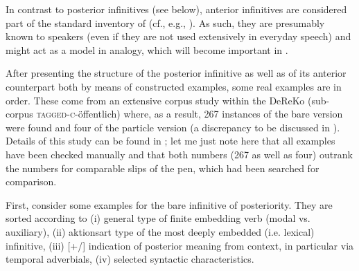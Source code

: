 \documentclass[output=paper,hidelinks]{langscibook}
\begin{document}
In contrast to posterior infinitives (see below), anterior infinitives are considered part of the standard inventory of  (cf., e.g., \citealt[2159–2160]{ZifonunStrecker1997}). As such, they are presumably known to speakers (even if they are not used extensively in everyday speech) and might act as a model in analogy, which will become important in .

After presenting the structure of the posterior infinitive as well as of its anterior counterpart both by means of constructed examples, some real examples are in order. These come from an extensive corpus study within the DeReKo (sub-corpus \textsc{tagged-c-}öffentlich) where, as a result, 267 instances of the bare version were found and four of the particle version (a discrepancy to be discussed in ). Details of this study can be found in \citet{Reiner2018}; let me just note here that all examples have been checked manually and that both numbers (267 as well as four) outrank the numbers for comparable slips of the pen, which had been searched for comparison.

First, consider some examples for the bare infinitive of posteriority. They are sorted according to (i) general type of finite embedding verb (modal vs. auxiliary), (ii) aktionsart type of the most deeply embedded (i.e. lexical) infinitive, (iii) [+/\textminus{}] indication of posterior meaning from context, in particular via temporal adverbials, (iv) selected syntactic characteristics.
\end{document}
